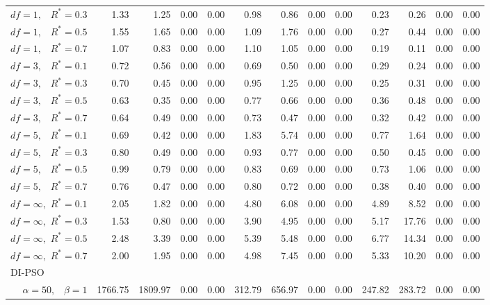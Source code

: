 \documentclass[12pt]{article}
\begin{document}
\begin{appendix}
\begin{table}[ht]
{\begin{tabular}{r|rrrr|rrrr|rrrr}
  $df = 1,\enspace$ $R^* =0.3$ & 1.33 & 1.25 & 0.00 & 0.00 & 0.98 & 0.86 & 0.00 & 0.00 & 0.23 & 0.26 & 0.00 & 0.00 \\ 
  $df = 1,\enspace$ $R^* =0.5$ & 1.55 & 1.65 & 0.00 & 0.00 & 1.09 & 1.76 & 0.00 & 0.00 & 0.27 & 0.44 & 0.00 & 0.00 \\ 
  $df = 1,\enspace$ $R^* =0.7$ & 1.07 & 0.83 & 0.00 & 0.00 & 1.10 & 1.05 & 0.00 & 0.00 & 0.19 & 0.11 & 0.00 & 0.00 \\ 
  $df = 3,\enspace$ $R^* =0.1$ & 0.72 & 0.56 & 0.00 & 0.00 & 0.69 & 0.50 & 0.00 & 0.00 & 0.29 & 0.24 & 0.00 & 0.00 \\ 
  $df = 3,\enspace$ $R^* =0.3$ & 0.70 & 0.45 & 0.00 & 0.00 & 0.95 & 1.25 & 0.00 & 0.00 & 0.25 & 0.31 & 0.00 & 0.00 \\ 
  $df = 3,\enspace$ $R^* =0.5$ & 0.63 & 0.35 & 0.00 & 0.00 & 0.77 & 0.66 & 0.00 & 0.00 & 0.36 & 0.48 & 0.00 & 0.00 \\ 
  $df = 3,\enspace$ $R^* =0.7$ & 0.64 & 0.49 & 0.00 & 0.00 & 0.73 & 0.47 & 0.00 & 0.00 & 0.32 & 0.42 & 0.00 & 0.00 \\ 
  $df = 5,\enspace$ $R^* =0.1$ & 0.69 & 0.42 & 0.00 & 0.00 & 1.83 & 5.74 & 0.00 & 0.00 & 0.77 & 1.64 & 0.00 & 0.00 \\ 
  $df = 5,\enspace$ $R^* =0.3$ & 0.80 & 0.49 & 0.00 & 0.00 & 0.93 & 0.77 & 0.00 & 0.00 & 0.50 & 0.45 & 0.00 & 0.00 \\ 
  $df = 5,\enspace$ $R^* =0.5$ & 0.99 & 0.79 & 0.00 & 0.00 & 0.83 & 0.69 & 0.00 & 0.00 & 0.73 & 1.06 & 0.00 & 0.00 \\ 
  $df = 5,\enspace$ $R^* =0.7$ & 0.76 & 0.47 & 0.00 & 0.00 & 0.80 & 0.72 & 0.00 & 0.00 & 0.38 & 0.40 & 0.00 & 0.00 \\ 
  $df = \infty,$ $R^* =0.1$ & 2.05 & 1.82 & 0.00 & 0.00 & 4.80 & 6.08 & 0.00 & 0.00 & 4.89 & 8.52 & 0.00 & 0.00 \\ 
  $df = \infty,$ $R^* =0.3$ & 1.53 & 0.80 & 0.00 & 0.00 & 3.90 & 4.95 & 0.00 & 0.00 & 5.17 & 17.76 & 0.00 & 0.00 \\ 
  $df = \infty,$ $R^* =0.5$ & 2.48 & 3.39 & 0.00 & 0.00 & 5.39 & 5.48 & 0.00 & 0.00 & 6.77 & 14.34 & 0.00 & 0.00 \\ 
  $df = \infty,$ $R^* =0.7$ & 2.00 & 1.95 & 0.00 & 0.00 & 4.98 & 7.45 & 0.00 & 0.00 & 5.33 & 10.20 & 0.00 & 0.00 \\ 
\hline
\multicolumn{1}{l|}{DI-PSO} &&&&&&&&&&&&\\
  $\alpha = 50,\enspace$ $\beta =1$ & 1766.75 & 1809.97 & 0.00 & 0.00 & 312.79 & 656.97 & 0.00 & 0.00 & 247.82 & 283.72 & 0.00 & 0.00 \\ 

\end{tabular}}
\end{table}
\end{appendix}
\end{document}
